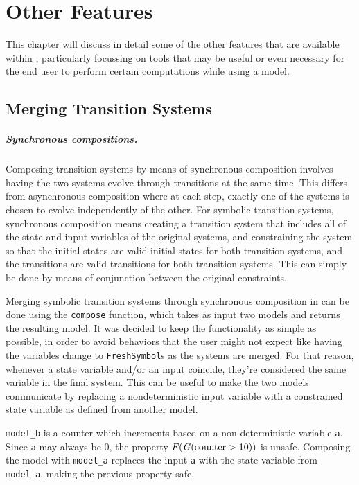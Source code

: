\chapter{Other Features}
\label{ch:other-features}

This chapter will discuss in detail some of the other features that are available within \pyvmt{}, particularly focussing on tools that may be useful or even necessary for the end user to perform certain computations while using a model.

\section{Merging Transition Systems}
\paragraph*{Synchronous compositions.}
Composing transition systems by means of synchronous composition involves having the two systems evolve through transitions at the same time.
This differs from asynchronous composition where at each step, exactly one of the systems is chosen to evolve independently of the other.
For symbolic transition systems, synchronous composition means creating a transition system that includes all of the state and input variables of the original systems, and constraining the system so that the initial states are valid initial states for both transition systems, and the transitions are valid transitions for both transition systems.
This can simply be done by means of conjunction between the original constraints.

Merging symbolic transition systems through synchronous composition in \pyvmt{} can be done using the \texttt{compose} function, which takes as input two models and returns the resulting model.
It was decided to keep the functionality as simple as possible, in order to avoid behaviors that the user might not expect like having the variables change to \texttt{FreshSymbol}s as the systems are merged.
For that reason, whenever a state variable and/or an input coincide, they're considered the same variable in the final system.
This can be useful to make the two models communicate by replacing a nondeterministic input variable with a constrained state variable as defined from another model.

\begin{listing}
    \label{alg:composition}
    \caption{\texttt{model\_b} is a counter which increments based on a non-deterministic variable \texttt{a}. Since \texttt{a} may always be 0, the property $\F (\G (\mathrm{counter} > 10))$ is unsafe.
    Composing the model with \texttt{model\_a} replaces the input \texttt{a} with the state variable from \texttt{model\_a}, making the previous property safe.}
\end{listing}

